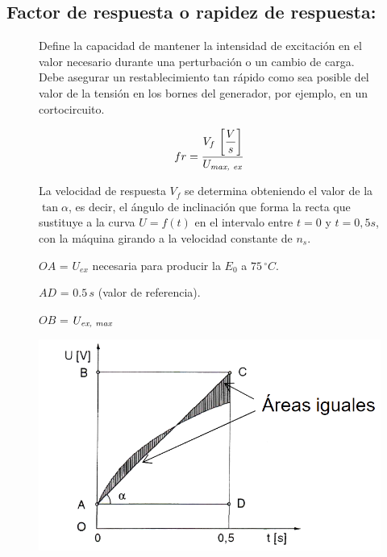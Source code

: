 		\subsection{Factor de respuesta o rapidez de respuesta:}
			\begin{figure}[H]
				\begin{minipage}{0.75\textwidth}
					Define la capacidad de mantener la intensidad de excitación en el valor necesario durante una perturbación o un cambio de carga. Debe asegurar un restablecimiento tan rápido como sea posible del valor de la tensión en los
					bornes del generador, por ejemplo, en un cortocircuito. 
				\end{minipage}
				\begin{minipage}{0.24\textwidth}
					\[fr = \dfrac{V_f\,\left[\dfrac{V}{s}\right]}{U_{\text{\textit{max, ex}}}}\]
				\end{minipage}
			\end{figure}			

			\begin{figure}[H]
				\begin{minipage}{0.6\textwidth}
					La velocidad de respuesta $V_f$ se determina obteniendo el valor de la $\tan \alpha$, es decir, el ángulo de inclinación que forma la recta que sustituye a la curva $U = f(t)$ en el intervalo entre $t=0$ y $t = 0,5 s$, con la máquina girando a la velocidad constante de $n_s$.
					
					\vspace{0.25cm}
					$OA$ = $U_{ex}$ necesaria para producir la $E_0$ a $75\,^\circ C$.
					
					$AD$ = $0.5\,s$ (valor de referencia).
					
					$OB$ = $U_{\text{\textit{ex, max}}}$
				\end{minipage}
				\begin{minipage}{0.4\textwidth}
					\includegraphics[width=1\linewidth]{res/tema7/tanAlpha}
				\end{minipage}
			\end{figure}
			
